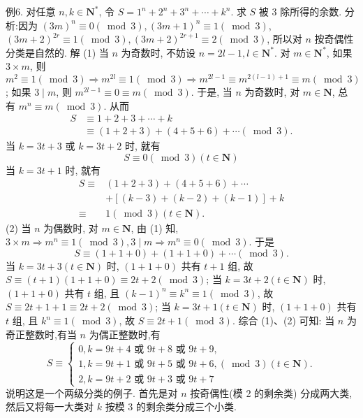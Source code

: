 例6. 对任意 $n, k \in \mathbf{N}^*$, 令 $S=1^n+2^n+3^n+\cdots+k^n$. 求 $S$ 被 3 除所得的余数.
分析:因为 $(3 m)^n \equiv 0(\bmod 3),(3 m+1)^n \equiv 1(\bmod 3)$, $(3 m+2)^{2 r} \equiv 1(\bmod 3),(3 m+2)^{2 r+1} \equiv 2(\bmod 3)$, 所以对 $n$ 按奇偶性分类是自然的.
解 (1) 当 $n$ 为奇数时, 不妨设 $n=2 l-1, l \in \mathbf{N}^*$. 对 $m \in \mathbf{N}^*$, 如果 $3 \times m$, 则 $m^2 \equiv 1(\bmod 3) \Rightarrow m^{2 l} \equiv 1(\bmod 3) \Rightarrow m^{2 l-1} \equiv m^{2(l-1)+1} \equiv m(\bmod 3)$; 如果 $3 \mid m$, 则 $m^{2 l-1} \equiv 0 \equiv m(\bmod 3)$. 于是, 当 $n$ 为奇数时, 对 $m \in \mathbf{N}$, 总有 $m^n \equiv m(\bmod 3)$. 从而
$$
\begin{aligned}
S & \equiv 1+2+3+\cdots+k \\
& \equiv(1+2+3)+(4+5+6)+\cdots(\bmod 3) .
\end{aligned}
$$
当 $k=3 t+3$ 或 $k=3 t+2$ 时, 就有
$$
S \equiv 0(\bmod 3)(t \in \mathbf{N})
$$
当 $k=3 t+1$ 时, 就有
$$
\begin{aligned}
S \equiv & (1+2+3)+(4+5+6)+\cdots \\
& +[(k-3)+(k-2)+(k-1)]+k \\
\equiv & 1(\bmod 3)(t \in \mathbf{N}) .
\end{aligned}
$$
(2) 当 $n$ 为偶数时, 对 $m \in \mathbf{N}$, 由 (1) 知, $3 \times m \Rightarrow m^n \equiv 1(\bmod 3), 3 \mid m \Rightarrow m^n \equiv 0(\bmod 3)$. 于是
$$
S \equiv(1+1+0)+(1+1+0)+\cdots(\bmod 3) .
$$
当 $k=3 t+3(t \in \mathbf{N})$ 时, $(1+1+0)$ 共有 $t+1$ 组, 故 $S \equiv(t+1)(1+1+0) \equiv 2 t+2(\bmod 3)$;
当 $k=3 t+2(t \in \mathbf{N})$ 时, $(1+1+0)$ 共有 $t$ 组, 且 $(k-1)^n \equiv k^n \equiv 1(\bmod 3)$, 故 $S \equiv 2 t+1+1 \equiv 2 t+2(\bmod 3)$;
当 $k=3 t+1(t \in \mathbf{N})$ 时, $(1+1+0)$ 共有 $t$ 组, 且 $k^n \equiv 1(\bmod 3)$, 故 $S \equiv 2 t+1(\bmod 3)$.
综合 (1)、(2) 可知:
当 $n$ 为奇正整数时,有当 $n$ 为偶正整数时,有
$$
S \equiv\left\{\begin{array}{l}
0, k=9 t+4 \text { 或 } 9 t+8 \text { 或 } 9 t+9, \\
1, k=9 t+1 \text { 或 } 9 t+5 \text { 或 } 9 t+6,(\bmod 3)(t \in \mathbf{N}) . \\
2, k=9 t+2 \text { 或 } 9 t+3 \text { 或 } 9 t+7
\end{array}\right.
$$
说明这是一个两级分类的例子.
首先是对 $n$ 按奇偶性(模 2 的剩余类) 分成两大类,然后又将每一大类对 $k$ 按模 3 的剩余类分成三个小类.



